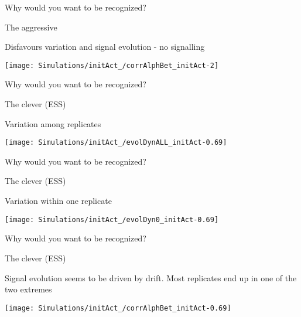 \documentclass[
  ignorenonframetext,
]{beamer}
\begin{document}
\begin{frame}{Why would you want to be recognized?}
\protect\hypertarget{why-would-you-want-to-be-recognized-7}{}

\begin{block}{The aggressive}

Disfavours variation and signal evolution - no signalling

\begin{flushleft}\texttt{[image: Simulations/initAct\_/corrAlphBet\_initAct-2]} \end{flushleft}

\end{block}

\end{frame}

\begin{frame}{Why would you want to be recognized?}
\protect\hypertarget{why-would-you-want-to-be-recognized-8}{}

\begin{block}{The clever (ESS)}

Variation among replicates

\begin{flushleft}\texttt{[image: Simulations/initAct\_/evolDynALL\_initAct-0.69]} \end{flushleft}

\end{block}

\end{frame}

\begin{frame}{Why would you want to be recognized?}
\protect\hypertarget{why-would-you-want-to-be-recognized-9}{}

\begin{block}{The clever (ESS)}

Variation within one replicate

\begin{flushleft}\texttt{[image: Simulations/initAct\_/evolDyn0\_initAct-0.69]} \end{flushleft}

\end{block}

\end{frame}

\begin{frame}{Why would you want to be recognized?}
\protect\hypertarget{why-would-you-want-to-be-recognized-10}{}

\begin{block}{The clever (ESS)}

Signal evolution seems to be driven by drift. Most replicates end up in
one of the two extremes

\begin{flushleft}\texttt{[image: Simulations/initAct\_/corrAlphBet\_initAct-0.69]} \end{flushleft}

\end{block}

\end{frame}
\end{document}
